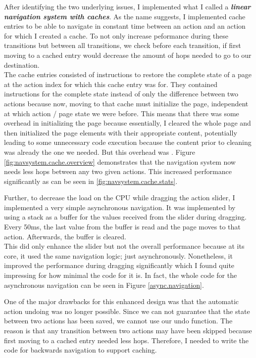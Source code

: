 After identifying the two underlying issues, I implemented what I called a \textbf{\textit{linear navigation system with caches}}. As the name suggests, I implemented cache entries to be able to navigate in constant time between an action and an action for which I created a cache. To not only increase peformance during these transitions but between all transitions, we check before each transition, if first moving to a cached entry would decrease the amount of hops needed to go to our destination. \\
The cache entries consisted of instructions to restore the complete state of a page at the action index for which this cache entry was for. They contained instructions for the complete state instead of only the difference between two actions because now, moving to that cache must initialize the page, independent at which action / page state we were before. This means that there was some overhead in initializing the page because essentially, I cleared the whole page and then initialized the page elements with their appropriate content, potentially leading to some unnecessary code execution because the content prior to cleaning was already the one we needed. But this overhead was . Figure \ref{fig:navsystem.cache.overview} demonstrates that the navigation system now needs less hops between any two given actions. This increased performance significantly as can be seen in \ref{fig:navsystem.cache.stats}.

Further, to decrease the load on the CPU while dragging the action slider, I implemented a very simple asynchronous navigation. It was implemented by using a stack as a buffer for the values received from the slider during dragging. Every 50ms, the last value from the buffer is read and the page moves to that action. Afterwards, the buffer is cleared. \\
This did only enhance the slider but not the overall performance because at its core, it used the same navigation logic; just asynchronously. Nonetheless, it improved the performance during dragging significantly which I found quite impressing for how minimal the code for it is. In fact, the whole code for the asynchronous navigation can be seen in Figure \ref{async.navigation}.

One of the major drawbacks for this enhanced design was that the automatic action undoing was no longer possible. Since we can not guarantee that the state between two actions has been saved, we cannot use our undo function. The reason is that any transition between two actions may have been skipped because first moving to a cached entry needed less hops. Therefore, I needed to write the code for backwards navigation to support caching.


